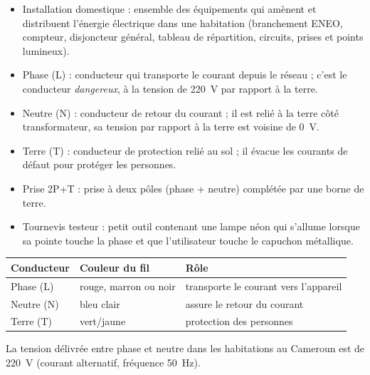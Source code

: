 \documentclass[11pt]{article}
\newcommand{\cle}[1]{{\popxbold\color{popdark}#1}}
\begin{document}
\begin{definition}
\begin{itemize}
  \item \cle{Installation domestique} : ensemble des équipements qui amènent et distribuent l'énergie électrique dans une habitation (branchement ENEO, compteur, disjoncteur général, tableau de répartition, circuits, prises et points lumineux).
  \item \cle{Phase} (L) : conducteur qui transporte le courant depuis le réseau ; c'est le conducteur \emph{dangereux}, à la tension de \SI{220}{V} par rapport à la terre.
  \item \cle{Neutre} (N) : conducteur de retour du courant ; il est relié à la terre côté transformateur, sa tension par rapport à la terre est voisine de \SI{0}{V}.
  \item \cle{Terre} (T) : conducteur de protection relié au sol ; il évacue les courants de défaut pour protéger les personnes.
  \item \cle{Prise 2P+T} : prise à deux pôles (phase + neutre) complétée par une borne de terre.
  \item \cle{Tournevis testeur} : petit outil contenant une lampe néon qui s'allume lorsque sa pointe touche la phase et que l'utilisateur touche le capuchon métallique.
\end{itemize}
\end{definition}

\begin{aretenir}
\begin{center}
\begin{tabularx}{\linewidth}{|l|X|X|}\hline
\rowcolor{popblueL} \textbf{Conducteur} & \textbf{Couleur du fil} & \textbf{Rôle} \\ \hline
Phase (L) & rouge, marron ou noir & transporte le courant vers l'appareil \\ \hline
Neutre (N) & bleu clair & assure le retour du courant \\ \hline
Terre (T) & vert/jaune & protection des personnes \\ \hline
\end{tabularx}
\end{center}
La tension délivrée entre phase et neutre dans les habitations au Cameroun est de \SI{220}{V} (courant alternatif, fréquence \SI{50}{Hz}).
\end{aretenir}
\end{document}

